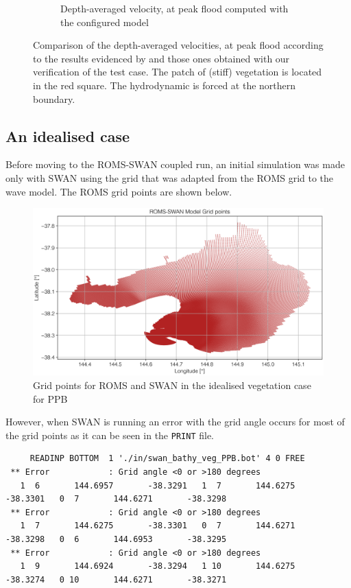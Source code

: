 \documentclass[12pt]{article}
\begin{document}
\begin{figure}[h]
\begin{subfigure}{.5\textwidth}
  \caption{Depth-averaged velocity, at peak flood computed with the configured model}
  \label{fig:depth_avg_vel_2}
\end{subfigure}
\caption{Comparison of the depth-averaged velocities, at peak flood according to the results evidenced by \textcite{Beudin2017} and those ones obtained with our verification of the test case. The patch of (stiff) vegetation is located in the red square. The hydrodynamic is forced at the northern boundary.}
\label{fig:grid_bathy_PPB}
\end{figure}

\subsection{An idealised case}

Before moving to the ROMS-SWAN coupled run, an initial simulation was made only with SWAN using the grid that was adapted from the ROMS grid to the wave model. The ROMS grid points are shown below.

\begin{figure}[H]
    \centering
    \includegraphics[scale=0.6]{plots/roms_grid.png}
    \caption{Grid points for ROMS and SWAN in the idealised vegetation case for PPB}
    \label{fig:roms_swan_grid_points}
\end{figure}

However, when SWAN is running an error with the grid angle occurs for most of the grid points as it can be seen in the \verb|PRINT| file.

\begin{lstlisting}
     READINP BOTTOM  1 './in/swan_bathy_veg_PPB.bot' 4 0 FREE
 ** Error            : Grid angle <0 or >180 degrees
   1  6       144.6957       -38.3291   1  7       144.6275       -38.3301   0  7       144.6271       -38.3298
 ** Error            : Grid angle <0 or >180 degrees
   1  7       144.6275       -38.3301   0  7       144.6271       -38.3298   0  6       144.6953       -38.3295
 ** Error            : Grid angle <0 or >180 degrees
   1  9       144.6924       -38.3294   1 10       144.6275       -38.3274   0 10       144.6271       -38.3271
\end{lstlisting}
\end{document}
